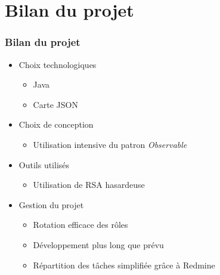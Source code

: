\section{Bilan du projet}
\begin{frame}
\frametitle{Bilan du projet}
\begin{itemize}
	\item Choix technologiques
	\begin{itemize}
		\item Java
		\item Carte JSON
	\end{itemize}
	\item Choix de conception
	\begin{itemize}
		\item Utilisation intensive du patron \em{Observable}
	\end{itemize}
	\item Outils utilisés
	\begin{itemize}
		\item Utilisation de RSA hasardeuse
	\end{itemize}
	\item Gestion du projet
	\begin{itemize}
		\item Rotation efficace des rôles
		\item Développement plus long que prévu
		\item Répartition des tâches simplifiée grâce à Redmine
	\end{itemize}
\end{itemize}
\end{frame}
